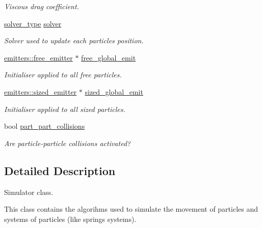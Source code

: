 \begin{DoxyCompactItemize}
\begin{DoxyCompactList}\small\item\em Viscous drag coefficient. \end{DoxyCompactList}\item 
\mbox{\label{classphysim_1_1simulator_a22425d61c50ef57ea39566d39c14e6a0}} 
\hyperlink{namespacephysim_a09adeda29c09e651877e880d31fc9686}{solver\+\_\+type} \hyperlink{classphysim_1_1simulator_a22425d61c50ef57ea39566d39c14e6a0}{solver}
\begin{DoxyCompactList}\small\item\em Solver used to update each particle\textquotesingle{}s position. \end{DoxyCompactList}\item 
\hyperlink{classphysim_1_1emitters_1_1free__emitter}{emitters\+::free\+\_\+emitter} $\ast$ \hyperlink{classphysim_1_1simulator_a05e2840fc39c644d7005ea938e63202f}{free\+\_\+global\+\_\+emit}
\begin{DoxyCompactList}\small\item\em Initialiser applied to all free particles. \end{DoxyCompactList}\item 
\hyperlink{classphysim_1_1emitters_1_1sized__emitter}{emitters\+::sized\+\_\+emitter} $\ast$ \hyperlink{classphysim_1_1simulator_a61d4f20480309e95fce1db56b7fc8a88}{sized\+\_\+global\+\_\+emit}
\begin{DoxyCompactList}\small\item\em Initialiser applied to all sized particles. \end{DoxyCompactList}\item 
bool \hyperlink{classphysim_1_1simulator_a4a7d02feac1ca57bb143b70ad8b81134}{part\+\_\+part\+\_\+collisions}
\begin{DoxyCompactList}\small\item\em Are particle-\/particle collisions activated? \end{DoxyCompactList}\end{DoxyCompactItemize}


\subsection{Detailed Description}
Simulator class. 

This class contains the algorihms used to simulate the movement of particles and systems of particles (like springs systems).

